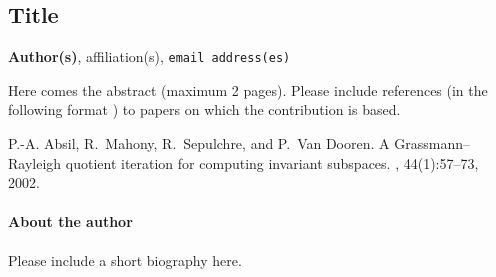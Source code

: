 \documentclass[11pt]{article}
\begin{document}
\subsection*{Title}

{\bf Author(s)}, affiliation(s), {\tt email address(es)} %

\bigskip

Here comes the abstract (maximum 2 pages). Please include references (in the following format \cite{AMSD02}) to papers on which the contribution is based.  

\begin{thebibliography}{1}

P.-A. Absil, R.~Mahony, R.~Sepulchre, and P.~Van Dooren.
\newblock A {G}rassmann--{R}ayleigh quotient iteration for computing invariant
  subspaces.
, 44(1):57--73, 2002.

\end{thebibliography}

\paragraph{About the author}

Please include a short biography here.

\end{document}
